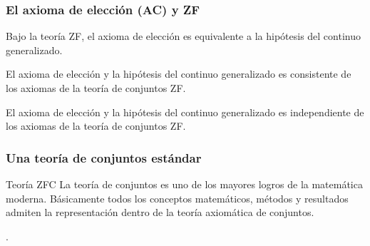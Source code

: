 \begin{frame}
 \frametitle{El axioma de elección (AC) y ZF}
 
 \begin{theorem}
  Bajo la teoría ZF, el axioma de elección es equivalente a la hipótesis del continuo generalizado.
 \end{theorem}
 
 \pause
 \begin{theorem}
  El axioma de elección y la hipótesis del continuo generalizado es consistente de los axiomas de la teoría de conjuntos ZF.
 \end{theorem}
 
 \pause
 \begin{theorem}
  El axioma de elección y la hipótesis del continuo generalizado es independiente de los axiomas de la teoría de conjuntos ZF.
 \end{theorem}
\end{frame}


\begin{frame}
\frametitle{Una teoría de conjuntos estándar}

\begin{alertblock}{Teoría ZFC}
	\justify
	La teoría de conjuntos es uno de los mayores logros de la matemática moderna. Básicamente todos los conceptos matemáticos, métodos y resultados admiten la representación dentro de la teoría axiomática de conjuntos.
\end{alertblock}

\nocite{jech2003set,kuratowski2014introduction,pickover2009math,herrlich2006axiom}.
\end{frame}